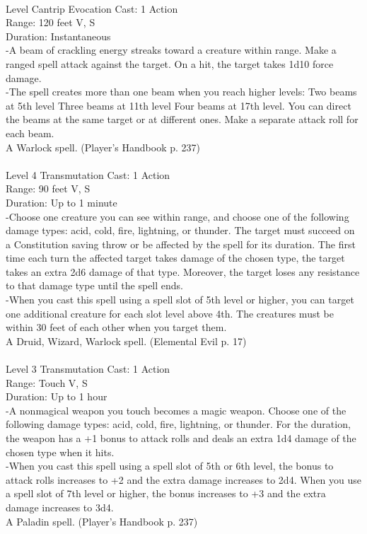 \documentclass[10pt,twocolumn]{report}
\begin{document}
 \\
Level Cantrip \quad Evocation \quad Cast: 1 Action\\
Range: 120 feet \quad V, S\\
Duration: Instantaneous \quad \\
-A beam of crackling energy streaks toward a creature within range. Make a ranged spell attack against the target. On a hit, the target takes 1d10 force damage.\\
-The spell creates more than one beam when you reach higher levels: 
Two beams at 5th level
Three beams at 11th level
Four beams at 17th level. 
You can direct the beams at the same target or at different ones. Make a separate attack roll for each beam.\\
A Warlock spell. (Player's Handbook p. 237) \\


 \\
Level 4 \quad Transmutation \quad Cast: 1 Action\\
Range: 90 feet \quad V, S\\
Duration: Up to 1 minute \quad \\
-Choose one creature you can see within range, and choose one of the following damage types: acid, cold, fire, lightning, or thunder.
The target must succeed on a Constitution saving throw or be affected by the spell for its duration. The first time each turn the affected target takes damage of the chosen type, the target takes an extra 2d6 damage of that type. Moreover, the target loses any resistance to that damage type until the spell ends.\\
-When you cast this spell using a spell slot of 5th level or higher, you can target one additional creature for each slot level above 4th. The creatures must be within 30 feet of each other when you target them.\\
A Druid, Wizard, Warlock spell. (Elemental Evil p. 17) \\


 \\
Level 3 \quad Transmutation \quad Cast: 1 Action\\
Range: Touch \quad V, S\\
Duration: Up to 1 hour \quad \\
-A nonmagical weapon you touch becomes a magic weapon. 
Choose one of the following damage types: acid, cold, fire, lightning, or thunder. For the duration, the weapon has a +1 bonus to attack rolls and deals an extra 1d4 damage of the chosen type when it hits.\\
-When you cast this spell using a spell slot of 5th or 6th level, the bonus to attack rolls increases to +2 and the extra damage increases to 2d4. 
When you use a spell slot of 7th level or higher, the bonus increases to +3 and the extra damage increases to 3d4.\\
A Paladin spell. (Player's Handbook p. 237) \\
\end{document}
